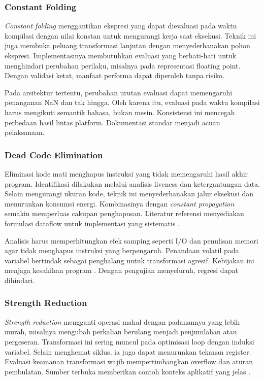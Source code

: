 \documentclass[../main.tex]{subfiles}
\begin{document}
\subsubsection{Constant Folding}
\emph{Constant folding} menggantikan ekspresi yang dapat dievaluasi pada waktu kompilasi dengan nilai konstan untuk mengurangi kerja saat eksekusi. Teknik ini juga membuka peluang transformasi lanjutan dengan menyederhanakan pohon ekspresi. Implementasinya membutuhkan evaluasi yang berhati-hati untuk menghindari perubahan perilaku, misalnya pada representasi floating point. Dengan validasi ketat, manfaat performa dapat diperoleh tanpa risiko.

Pada arsitektur tertentu, perubahan urutan evaluasi dapat memengaruhi penanganan NaN dan tak hingga. Oleh karena itu, evaluasi pada waktu kompilasi harus mengikuti semantik bahasa, bukan mesin. Konsistensi ini mencegah perbedaan hasil lintas platform. Dokumentasi standar menjadi acuan pelaksanaan.

\subsubsection{Dead Code Elimination}
Eliminasi kode mati menghapus instruksi yang tidak memengaruhi hasil akhir program. Identifikasi dilakukan melalui analisis liveness dan ketergantungan data. Selain mengurangi ukuran kode, teknik ini menyederhanakan jalur eksekusi dan menurunkan konsumsi energi. Kombinasinya dengan \emph{constant propagation} semakin memperluas cakupan penghapusan. Literatur referensi menyediakan formulasi dataflow untuk implementasi yang sistematis \citep{WikiDCE}.

Analisis harus memperhitungkan efek samping seperti I/O dan penulisan memori agar tidak menghapus instruksi yang berpengaruh. Penandaan volatil pada variabel bertindak sebagai penghalang untuk transformasi agresif. Kebijakan ini menjaga kesahihan program \citep{WikiDCE}. Dengan pengujian menyeluruh, regresi dapat dihindari.

\subsubsection{Strength Reduction}
\emph{Strength reduction} mengganti operasi mahal dengan padanannya yang lebih murah, misalnya mengubah perkalian berulang menjadi penjumlahan atau pergeseran. Transformasi ini sering muncul pada optimisasi loop dengan induksi variabel. Selain menghemat siklus, ia juga dapat menurunkan tekanan register. Evaluasi keamanan transformasi wajib mempertimbangkan overflow dan aturan pembulatan. Sumber terbuka memberikan contoh konteks aplikatif yang jelas \citep{WikiStrengthReduction}.
\end{document}
